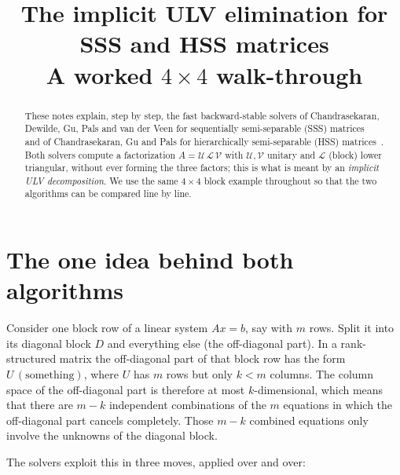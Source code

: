 \documentclass[11pt]{article}
\title{The implicit ULV elimination for SSS and HSS matrices\\[2pt]
\large A worked $4\times4$ walk-through}
\author{}
\date{}
\theoremstyle{definition}
\begin{document}
\maketitle

\begin{abstract}
These notes explain, step by step, the fast backward-stable solvers of
Chandrasekaran, Dewilde, Gu, Pals and van der Veen for sequentially
semi-separable (SSS) matrices~\cite{CDGPV02,CDGPSVW05} and of Chandrasekaran,
Gu and Pals for hierarchically semi-separable (HSS) matrices~\cite{CGP06}.
Both solvers compute a factorization $A = \mathcal U\,\mathcal L\,\mathcal V$
with $\mathcal U,\mathcal V$ unitary and $\mathcal L$ (block) lower triangular,
without ever forming the three factors; this is what is meant by an
\emph{implicit ULV decomposition}. We use the same $4\times4$ block example
throughout so that the two algorithms can be compared line by line.
\end{abstract}

\tableofcontents

\section*{The one idea behind both algorithms}

Consider one block row of a linear system $Ax=b$, say with $m$ rows. Split it
into its diagonal block $D$ and everything else (the off-diagonal part). In a
rank-structured matrix the off-diagonal part of that block row has the form
$U\,(\text{something})$, where $U$ has $m$ rows but only $k<m$ columns. The
column space of the off-diagonal part is therefore at most $k$-dimensional,
which means that there are $m-k$ independent combinations of the $m$ equations
in which the off-diagonal part cancels completely. Those $m-k$ combined
equations only involve the unknowns of the diagonal block.

The solvers exploit this in three moves, applied over and over:
\end{document}
